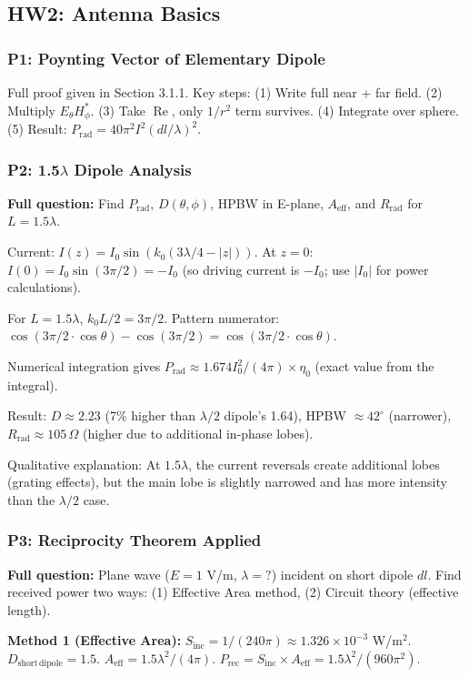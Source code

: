 \documentclass[10pt,letterpaper]{article}
\newcommand{\Aeff}{A_{\mathrm{eff}}}
\newcommand{\Real}{\operatorname{Re}}
\newcommand{\degrees}{^{\circ}}
\begin{document}
\subsection{HW2: Antenna Basics}

\subsubsection{P1: Poynting Vector of Elementary Dipole}
Full proof given in Section 3.1.1. Key steps: (1) Write full near + far field. (2) Multiply $E_\theta H_\phi^*$. (3) Take $\Real$, only $1/r^2$ term survives. (4) Integrate over sphere. (5) Result: $P_\mathrm{rad} = 40\pi^2 I^2(dl/\lambda)^2$.

\subsubsection{P2: 1.5$\lambda$ Dipole Analysis}
\textbf{Full question:} Find $P_\mathrm{rad}$, $D(\theta,\phi)$, HPBW in E-plane, $\Aeff$, and $R_\mathrm{rad}$ for $L=1.5\lambda$.

Current: $I(z) = I_0\sin(k_0(3\lambda/4 - |z|))$. At $z=0$: $I(0) = I_0\sin(3\pi/2) = -I_0$ (so driving current is $-I_0$; use $|I_0|$ for power calculations).

For $L=1.5\lambda$, $k_0L/2 = 3\pi/2$. Pattern numerator: $\cos(3\pi/2\cdot\cos\theta) - \cos(3\pi/2) = \cos(3\pi/2\cdot\cos\theta)$.

Numerical integration gives $P_\mathrm{rad}\approx 1.674 I_0^2/(4\pi)\times\eta_0$ (exact value from the integral).

Result: $D\approx2.23$ (7\% higher than $\lambda/2$ dipole's 1.64), HPBW $\approx 42\degrees$ (narrower), $R_\mathrm{rad}\approx105\,\Omega$ (higher due to additional in-phase lobes).

Qualitative explanation: At $1.5\lambda$, the current reversals create additional lobes (grating effects), but the main lobe is slightly narrowed and has more intensity than the $\lambda/2$ case.

\subsubsection{P3: Reciprocity Theorem Applied}
\textbf{Full question:} Plane wave ($E = 1$ V/m, $\lambda = ?$) incident on short dipole $dl$. Find received power two ways: (1) Effective Area method, (2) Circuit theory (effective length).

\textbf{Method 1 (Effective Area):}
$S_\mathrm{inc} = 1/(240\pi)\approx1.326\times10^{-3}$ W/m$^2$.
$D_\mathrm{short\,dipole} = 1.5$. $\Aeff = 1.5\lambda^2/(4\pi)$.
$P_\mathrm{rec} = S_\mathrm{inc}\times\Aeff = 1.5\lambda^2/(960\pi^2)$.
\end{document}
